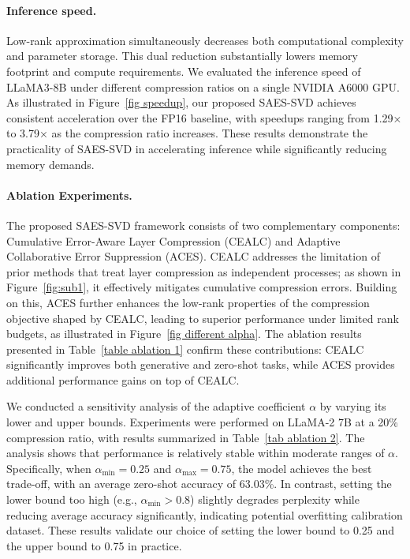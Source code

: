 \paragraph{Inference speed.} Low-rank approximation simultaneously decreases both computational complexity and parameter storage. This dual reduction substantially lowers memory footprint and compute requirements. We evaluated the inference speed of LLaMA3-8B under different compression ratios on a single NVIDIA A6000 GPU. As illustrated in Figure~\ref{fig speedup}, our proposed SAES-SVD achieves consistent acceleration over the FP16 baseline, with speedups ranging from 1.29× to 3.79× as the compression ratio increases. These results demonstrate the practicality of SAES-SVD in accelerating inference while significantly reducing memory demands.


\vspace{-0.3cm}
\paragraph{Ablation Experiments.}   

The proposed SAES-SVD framework consists of two complementary components: Cumulative Error-Aware Layer Compression (CEALC) and Adaptive Collaborative Error Suppression (ACES). CEALC addresses the limitation of prior methods that treat layer compression as independent processes; as shown in Figure~\ref{fig:sub1}, it effectively mitigates cumulative compression errors. Building on this, ACES further enhances the low-rank properties of the compression objective shaped by CEALC, leading to superior performance under limited rank budgets, as illustrated in Figure~\ref{fig different alpha}. The ablation results presented in Table~\ref{table ablation 1} confirm these contributions: CEALC significantly improves both generative and zero-shot tasks, while ACES provides additional performance gains on top of CEALC.


We conducted a sensitivity analysis of the adaptive coefficient $\alpha$ by varying its lower and upper bounds. Experiments were performed on LLaMA-2 7B at a 20\% compression ratio, with results summarized in Table~\ref{tab ablation 2}. The analysis shows that performance is relatively stable within moderate ranges of $\alpha$. Specifically, when $\alpha_{\min}=0.25$ and $\alpha_{\max}=0.75$, the model achieves the best trade-off, with an average zero-shot accuracy of 63.03\%. In contrast, setting the lower bound too high (e.g., $\alpha_{\min} > 0.8$) slightly degrades perplexity while reducing average accuracy significantly, indicating potential overfitting calibration dataset. These results validate our choice of setting the lower bound to 0.25 and the upper bound to 0.75 in practice.


